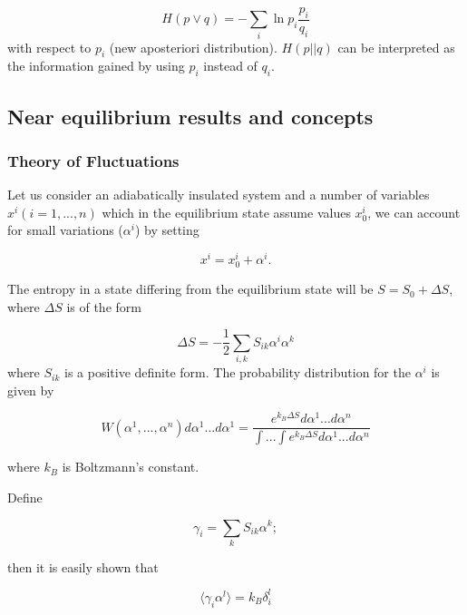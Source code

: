 \documentclass[a4paper,12pt,nofootinbib]{article}
\begin{document}
\begin{displaymath}
  H(p\lor q) = -\sum_i \ln p_i \frac{p_i}{q_i}
\end{displaymath}
with respect to $p_i$ (new aposteriori distribution). $H(p||q)$ can be interpreted as the information gained by using $p_i$ instead of $q_i$.


\subsection{Near equilibrium results and concepts}

\subsubsection{Theory of Fluctuations}

Let us consider an adiabatically insulated system and a number of variables $x^i (i=1,...,n)$ which in the equilibrium state assume values $ x_0^i $, we can account for small variations ($\alpha^i$) by setting

\begin{displaymath}
  x^i = x_0^i + \alpha^i.
\end{displaymath}

The entropy in a state differing from the equilibrium state will be $S=S_0+\Delta S$, where $\Delta S$ is of the form

\begin{displaymath}
  \Delta S = - \frac{1}{2} \sum_{i,k} S_{ik} \alpha^i \alpha^k
\end{displaymath}
where $ S_{ik} $ is a positive definite form. The probability distribution for the $\alpha^i$ is given by

\begin{displaymath}
  W(\alpha^1,...,\alpha^n)d\alpha^1 ... d\alpha^1= \frac{e^{k_B \Delta S} d\alpha^1...d\alpha^n}{\int ... \int e^{k_B \Delta S} d\alpha^1...d\alpha^n}
\end{displaymath}

where $k_B$ is Boltzmann's constant.

Define

\begin{equation}
\gamma_i =\sum_k S_{ik} \alpha^k; \label{gammai}	
\end{equation}
  

then it is easily shown that

\begin{equation}
\langle \gamma_i \alpha^l \rangle = k_B \delta_i^l	
\end{equation}
\end{document}
